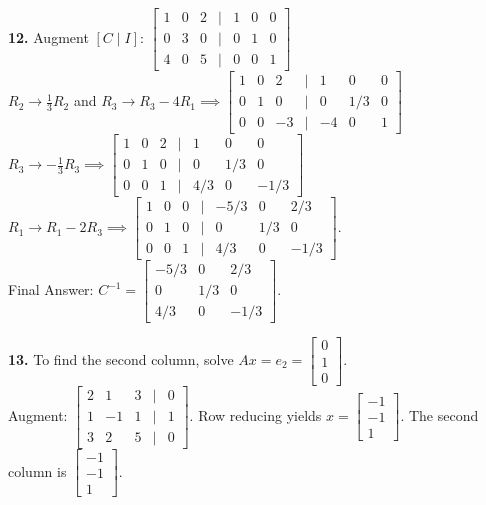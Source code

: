 \documentclass{article}
\begin{document}
\vspace{5pt}
\noindent
\textbf{12.} Augment $[C \mid I]$:
$\begin{bmatrix} 1 & 0 & 2 & \mid & 1 & 0 & 0 \\ 0 & 3 & 0 & \mid & 0 & 1 & 0 \\ 4 & 0 & 5 & \mid & 0 & 0 & 1 \end{bmatrix}$ \\
$R_2 \to \frac{1}{3}R_2$ and $R_3 \to R_3 - 4R_1 \implies \begin{bmatrix} 1 & 0 & 2 & \mid & 1 & 0 & 0 \\ 0 & 1 & 0 & \mid & 0 & 1/3 & 0 \\ 0 & 0 & -3 & \mid & -4 & 0 & 1 \end{bmatrix}$ \\
$R_3 \to -\frac{1}{3}R_3 \implies \begin{bmatrix} 1 & 0 & 2 & \mid & 1 & 0 & 0 \\ 0 & 1 & 0 & \mid & 0 & 1/3 & 0 \\ 0 & 0 & 1 & \mid & 4/3 & 0 & -1/3 \end{bmatrix}$ \\
$R_1 \to R_1 - 2R_3 \implies \begin{bmatrix} 1 & 0 & 0 & \mid & -5/3 & 0 & 2/3 \\ 0 & 1 & 0 & \mid & 0 & 1/3 & 0 \\ 0 & 0 & 1 & \mid & 4/3 & 0 & -1/3 \end{bmatrix}$. \\
Final Answer: $C^{-1} = \begin{bmatrix} -5/3 & 0 & 2/3 \\ 0 & 1/3 & 0 \\ 4/3 & 0 & -1/3 \end{bmatrix}$.

\vspace{5pt}
\noindent
\textbf{13.} To find the second column, solve $Ax = e_2 = \begin{bmatrix} 0 \\ 1 \\ 0 \end{bmatrix}$. \\
Augment: $\begin{bmatrix} 2 & 1 & 3 & \mid & 0 \\ 1 & -1 & 1 & \mid & 1 \\ 3 & 2 & 5 & \mid & 0 \end{bmatrix}$. Row reducing yields $x = \begin{bmatrix} -1 \\ -1 \\ 1 \end{bmatrix}$. The second column is $\begin{bmatrix} -1 \\ -1 \\ 1 \end{bmatrix}$.
\end{document}
